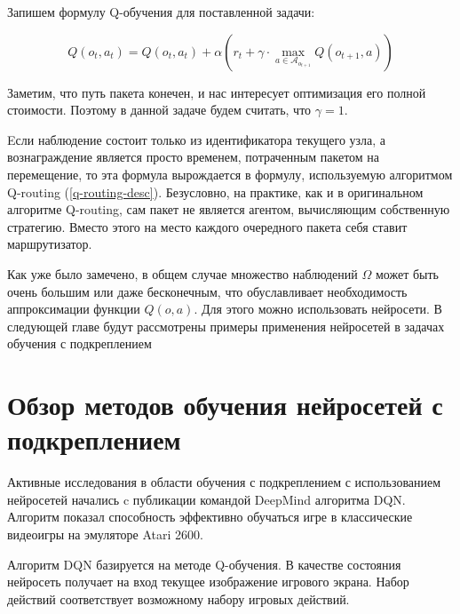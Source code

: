 \documentclass[specification, annotation]{itmo-student-thesis}
\begin{document}
Запишем формулу Q-обучения для поставленной задачи:

\[
Q(o_t, a_t) = Q(o_t, a_t) + \alpha \left( r_t +
\gamma \cdot \max\limits_{a \in \mathcal{A}_{o_{t+1}}} Q(o_{t+1}, a) \right)
\]

Заметим, что путь пакета конечен, и нас интересует оптимизация его полной
стоимости. Поэтому в данной задаче будем считать, что $\gamma = 1$.

Eсли наблюдение состоит только из идентификатора текущего
узла, а вознаграждение является просто временем, потраченным пакетом на
перемещение, то эта формула вырождается в формулу, используемую алгоритмом
Q-routing (\ref{q-routing-desc}). Безусловно, на практике, как и в оригинальном
алгоритме Q-routing, сам пакет не является агентом, вычисляющим собственную
стратегию. Вместо этого на место каждого очередного пакета себя ставит
маршрутизатор.

Как уже было замечено, в общем случае множество наблюдений $\Omega$ может быть
очень большим или даже бесконечным, что обуславливает необходимость
аппроксимации функции $Q(o, a)$. Для этого можно использовать нейросети. В
следующей главе будут рассмотрены примеры применения нейросетей в задачах
обучения с подкреплением

\section{Обзор методов обучения нейросетей с подкреплением}\label{overview:nns}

Активные исследования в области обучения с подкреплением с использованием
нейросетей начались c публикации командой DeepMind алгоритма
DQN\cite{deepmind-dqn-orig}. Алгоритм показал способность эффективно обучаться
игре в классические видеоигры на эмуляторе Atari 2600. 

Алгоритм DQN базируется на методе Q-обучения. В качестве состояния нейросеть
получает на вход текущее изображение игрового экрана. Набор действий
соответствует возможному набору игровых действий.
\end{document}
